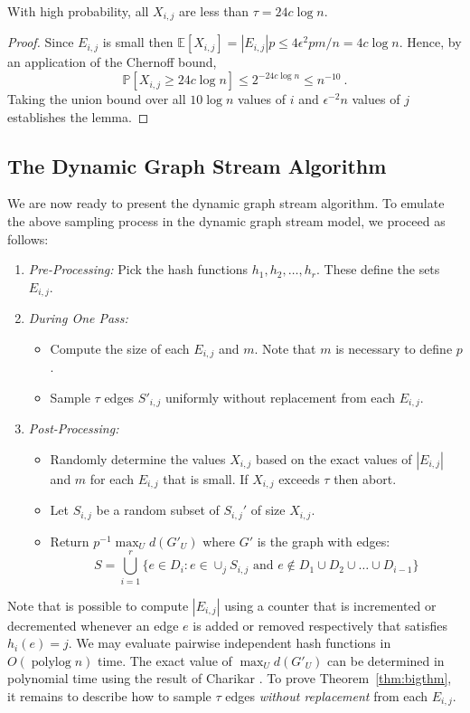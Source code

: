 \documentclass[11pt]{article}
\newcommand{\expec}[1]{\mathbb E\left [ #1 \right ]}
\DeclareMathOperator{\polylog}{polylog}
\newcommand{\prob}[1]{\mathbb P \left [ #1 \right ]}
\begin{document}
\begin{lemma}
With high probability, all $X_{i,j}$ are less than $\tau=24 c  \log n$.
\end{lemma}
\begin{proof}
Since $E_{i,j}$ is small then $\expec{X_{i,j}}=|E_{i,j}|p \leq 4\epsilon^{2}p  m/n  = 4c \log n$. Hence, by an application of the Chernoff bound, 
\[\prob{X_{i,j}\geq 24 c \log n} \leq 2^{-24 c \log n} \leq n^{-10} \ .\] Taking the union bound over all $10\log n$ values of $i$ and $\epsilon^{-2}n$ values of $j$ establishes the lemma. 
\end{proof}


\subsection{The Dynamic Graph Stream Algorithm}

We are now ready to present the dynamic graph stream algorithm. To emulate the above sampling process in the dynamic graph stream model, we proceed as follows:
\begin{enumerate}
\item {\em Pre-Processing:} Pick the hash functions $h_1, h_2, \ldots, h_r$. These define the sets $E_{i,j}$.
\item {\em During One Pass:} 
\begin{itemize}
\item Compute the size of each $E_{i,j}$ and $m$. Note that $m$ is necessary to define $p$.
\item Sample $\tau $ edges $S'_{i,j}$ uniformly without replacement from each $E_{i,j}$. 
\end{itemize}
\item {\em Post-Processing:}
\begin{itemize}
\item Randomly determine the values $X_{i,j}$ based on the exact values of $|E_{i,j}|$ and $m$ for each $E_{i,j}$ that is small. If $X_{i,j}$ exceeds $\tau$ then abort.
\item Let $S_{i,j}$ be a random subset of $S_{i,j}'$ of size $X_{i,j}$.
\item Return $p^{-1}\max_U d(G'_U)$ where $G'$ is the graph with edges:
\[
S=\bigcup_{i=1}^{r} \{e\in D_i: e\in \cup_j S_{i,j} \mbox{ and } e\not \in D_1\cup D_2 \cup \ldots \cup D_{i-1}\}
\]
\end{itemize}
\end{enumerate}

Note that is possible to compute  $|E_{i,j}|$ using a  counter that is incremented or decremented whenever an edge $e$ is added or removed respectively that satisfies $h_i(e)=j$. We may evaluate pairwise independent hash functions in $O(\polylog n)$ time. The exact value of $\max_U d(G'_U)$ can be determined in polynomial time using the result of Charikar \cite{Charikar00}. To prove Theorem~\ref{thm:bigthm}, it remains to describe how to sample $\tau$ edges \emph{without replacement} from each $E_{i,j}$.
\end{document}
